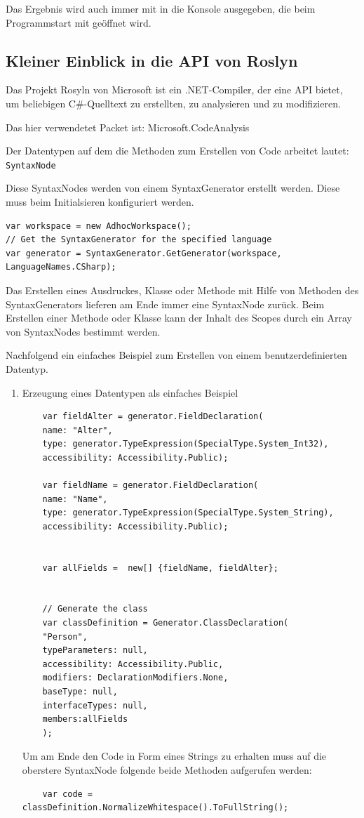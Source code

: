 Das Ergebnis wird auch immer mit in die Konsole ausgegeben, die beim
Programmstart mit geöffnet wird.


\subsection{Kleiner Einblick in die API von Roslyn}

Das Projekt Rosyln von Microsoft ist ein .NET-Compiler, der eine API bietet, um beliebigen C\#-Quelltext zu erstellten,
zu analysieren und zu modifizieren.

Das hier verwendetet Packet ist: Microsoft.CodeAnalysis

Der Datentypen auf dem die Methoden zum Erstellen von Code arbeitet lautet:
\texttt{SyntaxNode} 

Diese SyntaxNodes werden von einem SyntaxGenerator erstellt werden.
Diese muss beim Initialsieren konfiguriert werden.

\begin{verbatim}
var workspace = new AdhocWorkspace();
// Get the SyntaxGenerator for the specified language
var generator = SyntaxGenerator.GetGenerator(workspace, LanguageNames.CSharp);
\end{verbatim}


Das Erstellen eines Ausdruckes, Klasse oder Methode mit Hilfe von Methoden
des SyntaxGenerators lieferen am Ende immer eine SyntaxNode zurück.
Beim Erstellen einer Methode oder Klasse kann der Inhalt des Scopes durch
ein Array von SyntaxNodes bestimmt werden.

Nachfolgend ein einfaches Beispiel zum Erstellen von einem
benutzerdefinierten Datentyp.

\begin{enumerate}
	\item Erzeugung eines Datentypen als einfaches Beispiel
	\label{sec:orgheadline42}
	
	\begin{verbatim}
	var fieldAlter = generator.FieldDeclaration(
	name: "Alter",
	type: generator.TypeExpression(SpecialType.System_Int32),
	accessibility: Accessibility.Public);
	
	var fieldName = generator.FieldDeclaration(
	name: "Name",
	type: generator.TypeExpression(SpecialType.System_String),
	accessibility: Accessibility.Public);
	
	
	var allFields =  new[] {fieldName, fieldAlter};
	
	
	// Generate the class
	var classDefinition = Generator.ClassDeclaration(
	"Person", 
	typeParameters: null,
	accessibility: Accessibility.Public,
	modifiers: DeclarationModifiers.None,
	baseType: null,
	interfaceTypes: null,
	members:allFields
	);
	\end{verbatim}
	
	Um am Ende den Code in Form eines Strings zu erhalten muss auf die oberstere
	SyntaxNode folgende beide Methoden aufgerufen werden:
	
	\begin{verbatim}
	var code = classDefinition.NormalizeWhitespace().ToFullString();
	\end{verbatim}
\end{enumerate}


